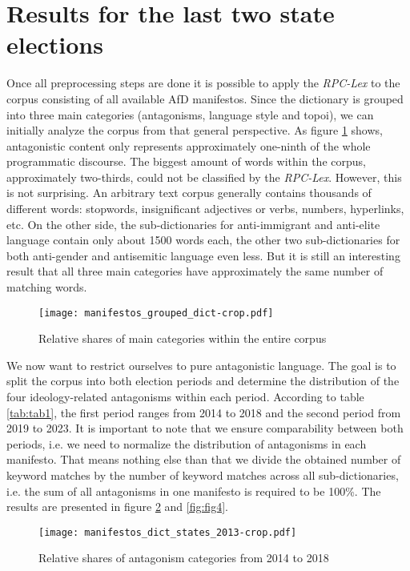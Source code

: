 \documentclass[a4paper]{scrreprt}
\begin{document}
\section{Results for the last two state elections}
Once all preprocessing steps are done it is possible to apply the {\em RPC-Lex} to the corpus consisting of all available AfD manifestos. Since the dictionary is grouped into three main categories (antagonisms, language style and topoi), we can initially analyze the corpus from that general perspective. As figure \ref{fig:fig2} shows, antagonistic content only represents approximately one-ninth of the whole programmatic discourse. The biggest amount of words within the corpus, approximately two-thirds, could not be classified by the {\em RPC-Lex}. However, this is not surprising. An arbitrary text corpus generally contains thousands of different words: stopwords, insignificant adjectives or verbs, numbers, hyperlinks, etc. On the other side, the sub-dictionaries for anti-immigrant and anti-elite language contain only about 1500 words each, the other two sub-dictionaries for both anti-gender and antisemitic language even less. But it is still an interesting result that all three main categories have approximately the same number of matching words.\par
\begin{figure}[ht]
    \centering
    \texttt{[image: manifestos\_grouped\_dict-crop.pdf]}
    \caption{Relative shares of main categories within the entire corpus}
    \label{fig:fig2}
\end{figure}
We now want to restrict ourselves to pure antagonistic language. The goal is to split the corpus into both election periods and determine the distribution of the four ideology-related antagonisms within each period. According to table \ref{tab:tab1}, the first period ranges from 2014 to 2018 and the second period from 2019 to 2023. It is important to note that we ensure comparability between both periods, i.e. we need to normalize the distribution of antagonisms in each manifesto. That means nothing else than that we divide the obtained number of keyword matches by the number of keyword matches across all sub-dictionaries, i.e. the sum of all antagonisms in one manifesto is required to be 100\%. The results are presented in figure \ref{fig:fig3} and \ref{fig:fig4}.\par
\begin{figure}[ht]
    \centering
    \texttt{[image: manifestos\_dict\_states\_2013-crop.pdf]}
    \caption{Relative shares of antagonism categories from 2014 to 2018}
    \label{fig:fig3}
\end{figure}
\end{document}

